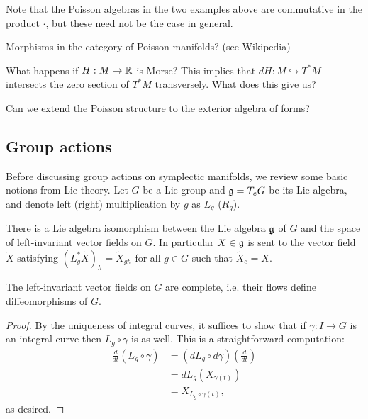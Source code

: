\documentclass{amsart}
\begin{document}
Note that the Poisson algebras in the two examples above are
commutative in the product $\cdot$, but these need not be the case in general.

Morphisms in the category of Poisson manifolds? (see Wikipedia)

What happens if $H:M\to\mathbb{R}$ is Morse? This implies that $dH:M\hookrightarrow T^*M$ intersects the zero section
of $T^*M$ transversely. What does this give us?

Can we extend the Poisson structure to the exterior algebra of forms?


\subsection{Group actions}

Before discussing group actions on symplectic manifolds, we review some basic notions
from Lie theory. Let $G$ be a Lie group and $\mathfrak g=T_eG$ be its Lie algebra, and denote
left (right) multiplication by $g$ as $L_g$ ($R_g$).

\begin{lemma}
    There is a Lie algebra isomorphism between the Lie algebra $\mathfrak g$ of $G$ and the space
    of left-invariant vector fields on $G$. In particular $X\in\mathfrak g$ is sent to the vector field
    $\tilde X$ satisfying $(L_g^*\tilde X)_h=\tilde X_{gh}$ for all $g\in G$ such that $\tilde X_e=X$.
\end{lemma}

\begin{lemma}
    The left-invariant vector fields on $G$ are complete, i.e. their flows define
    diffeomorphisms of $G$.
\end{lemma}
\begin{proof}
    By the uniqueness of integral curves, it suffices to show that if $\gamma:I\to G$ is
    an integral curve then $L_g\circ\gamma$ is as well. This is a straightforward computation:
    \begin{align*}
        \frac{d}{dt}\left( L_g\circ \gamma \right) &= (dL_g\circ d\gamma)\left( \frac{d}{dt} \right)\\
        &= dL_g(X_{\gamma(t)})\\
        &= X_{L_g\circ\gamma(t)},
    \end{align*}
    as desired.
\end{proof}
\end{document}
